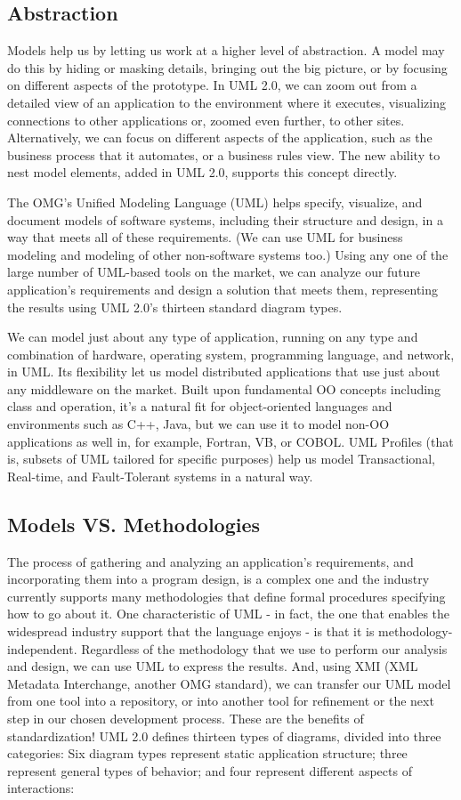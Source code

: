 \subsection{Abstraction}
\label{subsec:subsec01}
Models help us by letting us work at a higher level of abstraction. A model may do this by hiding or masking details, bringing out the big picture, 
or by focusing on different aspects of the prototype. In UML 2.0, we can zoom out from a detailed view of an application to the environment where it executes, 
visualizing connections to other applications or, zoomed even further, to other sites. Alternatively, we can focus on different aspects of the application, 
such as the business process that it automates, or a business rules view. The new ability to nest model elements, added in UML 2.0, 
supports this concept directly. 

The OMG's Unified Modeling Language (UML) helps specify, visualize, and document models of software systems, including their structure and design, 
in a way that meets all of these requirements. (We can use UML for business modeling and modeling of other non-software systems too.) 
Using any one of the large number of UML-based tools on the market, we can analyze our future application's requirements and design a solution that meets 
them, representing the results using UML 2.0's thirteen standard diagram types. 

We can model just about any type of application, running on any type and combination of hardware, operating system, programming language, 
and network, in UML. Its flexibility let us model distributed applications that use just about any middleware on the market. 
Built upon  fundamental OO concepts including class and operation, it's a natural fit for object-oriented languages and environments such as C++, Java, 
but we can use it to model non-OO applications as well in, for example, Fortran, VB, or COBOL. 
UML Profiles (that is, subsets of UML tailored for specific purposes) help us model Transactional, Real-time, and Fault-Tolerant systems in a natural way. 
\subsection{Models VS. Methodologies}
\label{subsec:subsec01}
The process of gathering and analyzing an application's requirements, and incorporating them into a program design, is a complex one and the industry currently
 supports many methodologies that define formal procedures specifying how to go about it. One characteristic of UML - in fact, the one that enables 
 the widespread industry support that the language enjoys - is that it is methodology-independent. Regardless of the methodology that we use to perform our
  analysis and design, we can use UML to express the results. And, using XMI (XML Metadata Interchange, another OMG standard), we can transfer 
  our UML model from one tool into a repository, or into another tool for refinement or the next step in our chosen development process. 
  These are the benefits of standardization!
UML 2.0 defines thirteen types of diagrams, divided into three categories: Six diagram types represent static 
application structure; three represent general types of behavior; and four represent different aspects of interactions:


